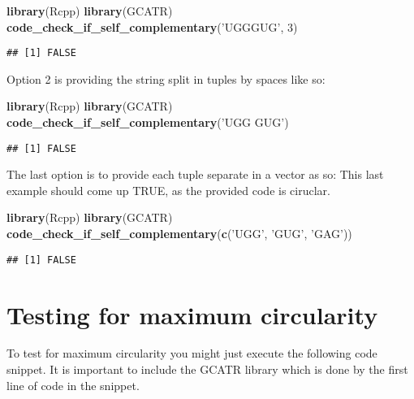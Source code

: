 \documentclass[
]{article}
\newenvironment{Shaded}{\begin{snugshade}}{\end{snugshade}}
\newcommand{\DecValTok}[1]{\textcolor[rgb]{0.00,0.00,0.81}{#1}}
\newcommand{\KeywordTok}[1]{\textcolor[rgb]{0.13,0.29,0.53}{\textbf{#1}}}
\newcommand{\NormalTok}[1]{#1}
\newcommand{\StringTok}[1]{\textcolor[rgb]{0.31,0.60,0.02}{#1}}
\begin{document}
\begin{Shaded}
\begin{Highlighting}[]
\KeywordTok{library}\NormalTok{(Rcpp)}
\KeywordTok{library}\NormalTok{(GCATR)}
\KeywordTok{code_check_if_self_complementary}\NormalTok{(}\StringTok{'UGGGUG'}\NormalTok{, }\DecValTok{3}\NormalTok{)}
\end{Highlighting}
\end{Shaded}

\begin{verbatim}
## [1] FALSE
\end{verbatim}

Option 2 is providing the string split in tuples by spaces like so:

\begin{Shaded}
\begin{Highlighting}[]
\KeywordTok{library}\NormalTok{(Rcpp)}
\KeywordTok{library}\NormalTok{(GCATR)}
\KeywordTok{code_check_if_self_complementary}\NormalTok{(}\StringTok{'UGG GUG'}\NormalTok{)}
\end{Highlighting}
\end{Shaded}

\begin{verbatim}
## [1] FALSE
\end{verbatim}

The last option is to provide each tuple separate in a vector as so:
This last example should come up TRUE, as the provided code is ciruclar.

\begin{Shaded}
\begin{Highlighting}[]
\KeywordTok{library}\NormalTok{(Rcpp)}
\KeywordTok{library}\NormalTok{(GCATR)}
\KeywordTok{code_check_if_self_complementary}\NormalTok{(}\KeywordTok{c}\NormalTok{(}\StringTok{'UGG'}\NormalTok{, }\StringTok{'GUG'}\NormalTok{, }\StringTok{'GAG'}\NormalTok{))}
\end{Highlighting}
\end{Shaded}

\begin{verbatim}
## [1] FALSE
\end{verbatim}

\hypertarget{testing-for-maximum-circularity}{%
\section{Testing for maximum
circularity}\label{testing-for-maximum-circularity}}

To test for maximum circularity you might just execute the following
code snippet. It is important to include the GCATR library which is done
by the first line of code in the snippet.
\end{document}
